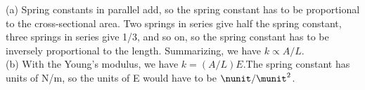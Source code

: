 (a) Spring constants in parallel add, so the spring constant has to be proportional
 to the cross-sectional area. Two springs in series give half the spring constant, 
three springs in series give 1/3, and so on, so the spring constant has to be 
inversely proportional to the length. Summarizing, we have $k\propto A/L$.\\
 (b) With the
 Young's modulus, we have $k=(A/L)E$.The spring constant has units of N/m, so
 the units of E would have to be $\nunit/\munit^2$.
